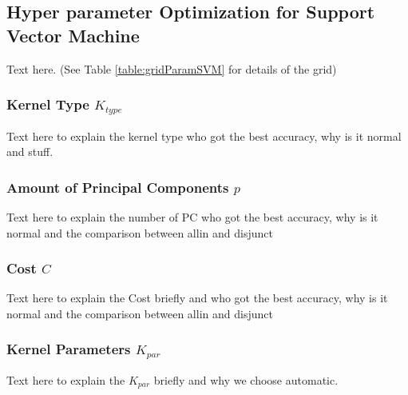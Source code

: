 \documentclass[conference]{IEEEtran}
\begin{document}
\subsection{Hyper parameter Optimization for Support Vector Machine}\label{sec:hyper:svm}
\textcolor{maxim}{
    Text here.
    (See Table \ref{table:gridParamSVM} for details of the grid) 
    \subsubsection{Kernel Type $K_{type}$}
    Text here to explain the kernel type who got the best accuracy, why is it normal and stuff. 
    \subsubsection{Amount of Principal Components $p$}
    Text here to explain the number of PC who got the best accuracy, why is it normal and the comparison between allin and disjunct
    \subsubsection{Cost $C$}
    Text here to explain the Cost briefly and who got the best accuracy, why is it normal and the comparison between allin and disjunct
    \subsubsection{Kernel Parameters $K_{par}$}
    Text here to explain the $K_{par}$ briefly and why we choose automatic.
}
\end{document}
